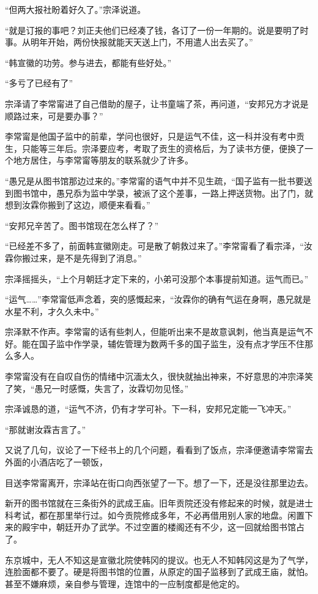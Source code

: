 “但两大报社盼着好久了。”宗泽说道。

“就是订报的事吧？刘正夫他们已经凑了钱，各订了一份一年期的。说是要明了时事。从明年开始，两份快报就能天天送上门，不用遣人出去买了。”

“韩宣徽的功劳。参与进去，都能有些好处。”

“多亏了已经有了”

宗泽请了李常甯进了自己借助的屋子，让书童端了茶，再问道，“安邦兄方才说是顺路过来，可是要办事？”

李常甯是他国子监中的前辈，学问也很好，只是运气不佳，这一科并没有考中贡生，只能等三年后。宗泽要应考，考取了贡生的资格后，为了读书方便，便换了一个地方居住，与李常甯等朋友的联系就少了许多。

“愚兄是从图书馆那边过来的。”李常甯的语气中并不见生疏，“国子监有一批书要送到图书馆中，愚兄忝为监中学录，被派了这个差事，一路上押送货物。出了门，就想到汝霖你搬到了这边，顺便来看看。”

“安邦兄辛苦了。图书馆现在怎么样了？”

“已经差不多了，前面韩宣徽刚走。可是散了朝救过来了。”李常甯看了看宗泽，“汝霖你搬过来，是不是先得到了消息。”

宗泽摇摇头，“上个月朝廷才定下来的，小弟可没那个本事提前知道。运气而已。”

“运气……”李常甯低声念着，突的感慨起来，“汝霖你的确有气运在身啊，愚兄就是水星不利，才久久未中。”

宗泽默不作声。李常甯的话有些刺人，但能听出来不是故意讽刺，他当真是运气不好。能在国子监中作学录，辅佐管理为数两千多的国子监生，没有点才学压不住那么多人。

李常甯没有在自叹自伤的情绪中沉湎太久，很快就抽出神来，不好意思的冲宗泽笑了笑，“愚兄一时感慨，失言了，汝霖切勿见怪。”

宗泽诚恳的道，“运气不济，仍有才学可补。下一科，安邦兄定能一飞冲天。”

“那就谢汝霖吉言了。”

又说了几句，议论了一下经书上的几个问题，看看到了饭点，宗泽便邀请李常甯去外面的小酒店吃了一顿饭，

目送李常甯离开，宗泽站在街口向西张望了一下。想了一下，还是没往那里边去。

新开的图书馆就在三条街外的武成王庙。旧年贡院还没有修起来的时候，就是进士科考试，都在那里举行过。如今贡院修成多年，不必再借用别人家的地盘。闲置下来的殿宇中，朝廷开办了武学。不过空置的楼阁还有不少，这一回就给图书馆占了。

东京城中，无人不知这是宣徽北院使韩冈的提议。也无人不知韩冈这是为了气学，连脸面都不要了。硬是将图书馆的位置，从原定的国子监移到了武成王庙，就怕。甚至不嫌麻烦，亲自参与管理，连馆中的一应制度都是他定的。

